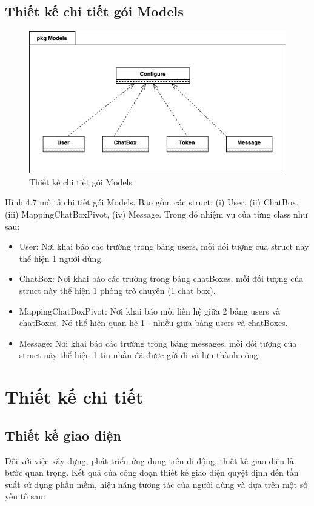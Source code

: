 \documentclass[../DoAn.tex]{subfiles}
\begin{document}
\subsection{Thiết kế chi tiết gói Models} 
\begin{figure}[H]
    \centering
    \includegraphics[width=0.9\linewidth]{Hinhve/Package/Models_Package_Detail_Backend.png}
    \caption{Thiết kế chi tiết gói Models}
    \label{fig:use_case_tổng_quan}
\end{figure}
Hình 4.7 mô tả chi tiết gói Models. Bao gồm các struct: (i) User, (ii) ChatBox, (iii) MappingChatBoxPivot, (iv) Message. Trong đó nhiệm vụ của từng class như sau:
\begin{itemize}
    \item User: Nơi khai báo các trường trong bảng users, mỗi đối tượng của struct này thể hiện 1 người dùng.
    \item ChatBox: Nơi khai báo các trường trong bảng chatBoxes, mỗi đối tượng của struct này thể hiện 1 phòng trò chuyện (1 chat box).
    \item MappingChatBoxPivot: Nơi khai báo mối liên hệ giữa 2 bảng users và chatBoxes. Nó thể hiện quan hệ 1 - nhiều giữa bảng users và chatBoxes.
    \item Message: Nơi khai báo các trường trong bảng messages, mỗi đối tượng của struct này thể hiện 1 tin nhắn đã được gửi đi và lưu thành công.
\end{itemize}\newpage



\section{Thiết kế chi tiết}
\subsection{Thiết kế giao diện}
Đối với việc xây dựng, phát triển ứng dụng trên di động, thiết kế giao diện là bước quan trọng. Kết quả của công đoạn thiết kế giao diện quyệt định đến tần suất sử dụng phần mềm, hiệu năng tương tác của người dùng và dựa trên một số yếu tố sau:
\end{document}
